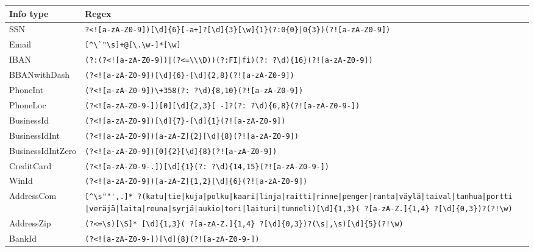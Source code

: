 \begin{table}[]
    \begin{tabularx}{\textwidth}{|L{0.18\textwidth}|Y|}
        \hline
        \textbf{Info type} &
        \textbf{Regex} \\ \hline
        SSN &
        \tiny{\verb=?<![a-zA-Z0-9])[\d]{6}[-a+]?[\d]{3}[\w]{1}(?:0{0}|0{3})(?![a-zA-Z0-9])=}
         \\ \hline
        Email &
        \tiny{\verb=[^\`"\s]+@[\.\w-]*[\w]=}
         \\ \hline
        IBAN &
        \tiny{\verb&(?:(?<![a-zA-Z0-9])|(?<=\\\D))(?:FI|fi)(?: ?\d){16}(?![a-zA-Z0-9])&}
        \\ \hline
        BBANwithDash &
        \tiny{\verb=(?<![a-zA-Z0-9])[\d]{6}-[\d]{2,8}(?![a-zA-Z0-9])=}
         \\ \hline
        PhoneInt &
        \tiny{\verb=(?<![a-zA-Z0-9])\+358(?: ?\d){8,10}(?![a-zA-Z0-9])=}
         \\ \hline
        PhoneLoc &
        \tiny{\verb=(?<![a-zA-Z0-9-])[0][\d]{2,3}[ -]?(?: ?\d){6,8}(?![a-zA-Z0-9-])=}
         \\ \hline
        BusinessId &
        \tiny{\verb=(?<![a-zA-Z0-9])[\d]{7}-[\d]{1}(?![a-zA-Z0-9])=}
         \\ \hline
        BusinessIdInt &
        \tiny{\verb=(?<![a-zA-Z0-9])[a-zA-Z]{2}[\d]{8}(?![a-zA-Z0-9])=}
         \\ \hline
        BusinessIdIntZero &
        \tiny{\verb=(?<![a-zA-Z0-9])[0]{2}[\d]{8}(?![a-zA-Z0-9])=}
         \\ \hline
        CreditCard &
        \tiny{\verb=(?<![a-zA-Z0-9-.])[\d]{1}(?: ?\d){14,15}(?![a-zA-Z0-9-])=}
         \\ \hline
        WinId &
        \tiny{\verb=(?<![a-zA-Z0-9])[a-zA-Z]{1,2}[\d]{6}(?![a-zA-Z0-9])=}
         \\ \hline
        AddressCom &
        \tiny{\verb=[^\s""',.]* ?=\texttt{(katu|tie|kuja|polku|kaari|linja|raitti|rinne|penger|ranta|väylä|taival|tanhua|portti}
        \texttt{|veräjä|laita|reuna|syrjä|aukio|tori|laituri|tunneli)}\verb=[\d]{1,3}( ?[a-zA-Z.]{1,4} ?[\d]{0,3})?(?!\w)=}
        \\ \hline
        AddressZip &
        \tiny{\verb&(?<=\s)[\S]* [\d]{1,3}( ?[a-zA-Z.]{1,4} ?[\d]{0,3})?(\s|,\s)[\d]{5}(?!\w)&}
         \\ \hline
        BankId &
        \tiny{\verb=(?<![a-zA-Z0-9-])[\d]{8}(?![a-zA-Z0-9-])=}
         \\ \hline

\end{tabularx}
\end{table}
